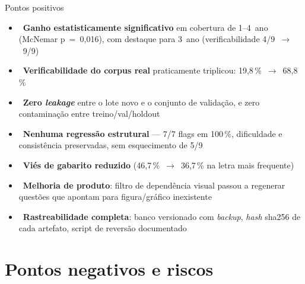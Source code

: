\documentclass[aspectratio=169,11pt]{beamer}
\newcommand{\okmark}{{\color{okgreen}\faCheckCircle}}
\begin{document}
\begin{frame}{Pontos positivos}
  \begin{itemize}
    \item \okmark\ \textbf{Ganho estatisticamente significativo} em cobertura
      de 1\textordmasculine–4\textordmasculine\ ano (McNemar p~=~0,016), com destaque para 3\textordmasculine\ ano
      (verificabilidade 4/9~$\to$~9/9)
    \item \okmark\ \textbf{Verificabilidade do corpus real} praticamente
      triplicou: 19,8\,\%~$\to$~68,8\,\%
    \item \okmark\ \textbf{Zero \emph{leakage}} entre o lote novo e o conjunto
      de validação, e zero contaminação entre treino/val/holdout
    \item \okmark\ \textbf{Nenhuma regressão estrutural} — 7/7 flags em
      100\,\%, dificuldade e consistência preservadas, sem esquecimento de
      5\textordmasculine/9\textordmasculine
    \item \okmark\ \textbf{Viés de gabarito reduzido} (46,7\,\%~$\to$~36,7\,\%
      na letra mais frequente)
    \item \okmark\ \textbf{Melhoria de produto}: filtro de dependência visual
      passou a regenerar questões que apontam para figura/gráfico inexistente
    \item \okmark\ \textbf{Rastreabilidade completa}: banco versionado com
      \emph{backup}, \emph{hash} sha256 de cada artefato, script de reversão
      documentado
  \end{itemize}
\end{frame}

\section{Pontos negativos e riscos}
\end{document}
